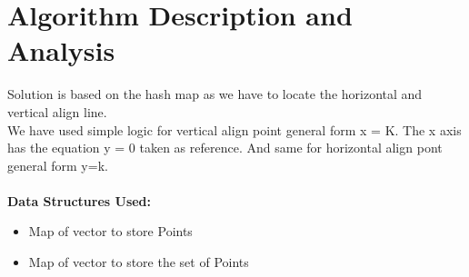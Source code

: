 \documentclass[conference]{IEEEtran}
\begin{document}
\section{\textbf {Algorithm Description and Analysis}}

\noindent  Solution is based on the hash map as we have to locate the horizontal and vertical align line.\\

\noindent We have used simple logic  for vertical align point general form x = K. The x axis has the equation y = 0 taken as reference. And same for horizontal align pont general form y=k.\\
\\\textbf{Data Structures Used:}

\begin{itemize}
\item	Map of vector to store Points
\item	Map of vector to store the set of Points\\
\end{itemize}
\end{document}

